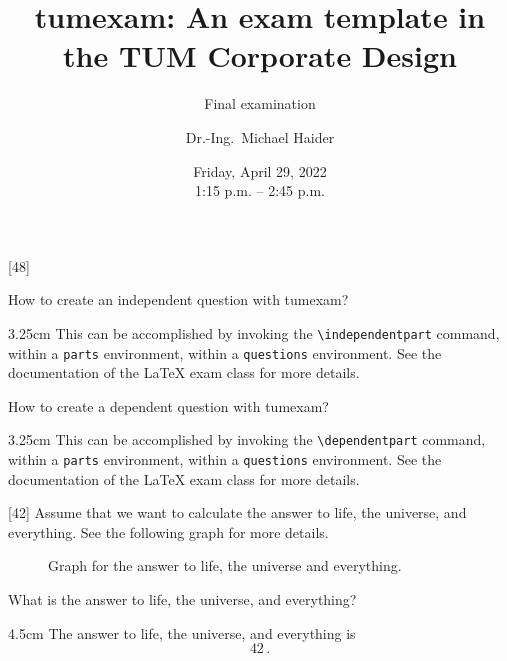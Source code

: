 \documentclass[english, @CLASSOPTIONS@]{tumexam}
\title{tumexam: An exam template in the TUM Corporate Design}
\subtitle{Final examination}
\author[orcid=0000-0002-5164-432X]{Dr.-Ing.\ Michael Haider}
\date{Friday, April 29, 2022\\
  1:15 p.m. -- 2:45 p.m.}
\begin{document}
\maketitle

\clearpage

\begin{questions}
  [48]
  \begin{parts}
    \independentpart
    How to create an independent question with tumexam?
    \begin{solutionbox}{3.25cm}
      This can be accomplished by invoking the \texttt{\textbackslash{independentpart}} command, within a \texttt{parts} environment, within a \texttt{questions} environment. See the documentation of the \LaTeX{} exam class for more details.
    \end{solutionbox}
    \dependentpart
    How to create a dependent question with tumexam?
    \begin{solutionbox}{3.25cm}
      This can be accomplished by invoking the \texttt{\textbackslash{dependentpart}} command, within a \texttt{parts} environment, within a \texttt{questions} environment. See the documentation of the \LaTeX{} exam class for more details.
    \end{solutionbox}
  \end{parts}
  \clearpage
  [42]
  Assume that we want to calculate the answer to life, the universe, and everything. See the following graph for more details.
  \begin{figure}[h]
    \centering
    \caption{Graph for the answer to life, the universe and everything.}
    \label{fig-graph-1}
  \end{figure}
  \begin{parts}
    \independentpart
    What is the answer to life, the universe, and everything?
    \begin{solutionbox}{4.5cm} %
      The answer to life, the universe, and everything is
      \begin{equation*}
        42\, .
      \end{equation*}
    \end{solutionbox}
  \end{parts}
  \clearpage
\end{questions}
\end{document}
